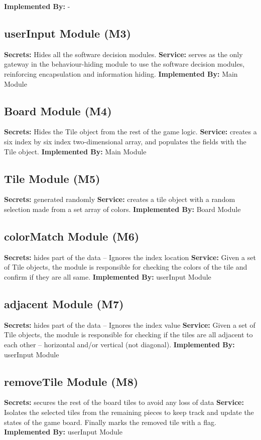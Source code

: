 \documentclass[12pt]{article}
\begin{document}
\textbf{Implemented By:} -

\subsection{userInput Module (M3)}
\textbf{Secrets:} Hides all the software decision modules.
\textbf{Service:} serves as the only gateway in the behaviour-hiding module to use the software decision modules, reinforcing encapsulation and information hiding. 
\textbf{Implemented By:} Main Module

\subsection{Board Module (M4)}
\textbf{Secrets:} Hides the Tile object from the rest of the game logic.
\textbf{Service:} creates a six index by six index two-dimensional array, and populates the fields with the Tile object.
\textbf{Implemented By:} Main Module


\subsection{Tile Module (M5)}
\textbf{Secrets:} generated randomly
\textbf{Service:} creates a tile object with a random selection made from a set array of colors. 
\textbf{Implemented By:} Board Module

\subsection{colorMatch Module (M6)}
\textbf{Secrets:} hides part of the data – Ignores the index location
\textbf{Service:} Given a set of Tile objects, the module is responsible for checking the colors of the tile and confirm if they are all same. 
\textbf{Implemented By:} userInput Module

\subsection{adjacent Module (M7)}
\textbf{Secrets:} hides part of the data – Ignores the index value
\textbf{Service:} Given a set of Tile objects, the module is responsible for checking if the tiles are all adjacent to each other – horizontal and/or vertical (not diagonal).
\textbf{Implemented By:} userInput Module

\subsection{removeTile Module (M8)}
\textbf{Secrets:} secures the rest of the board tiles to avoid any loss of data
\textbf{Service:} Isolates the selected tiles from the remaining pieces to keep track and update the states of the game board. Finally marks the removed tile with a flag.
\textbf{Implemented By:} userInput Module
\end{document}
